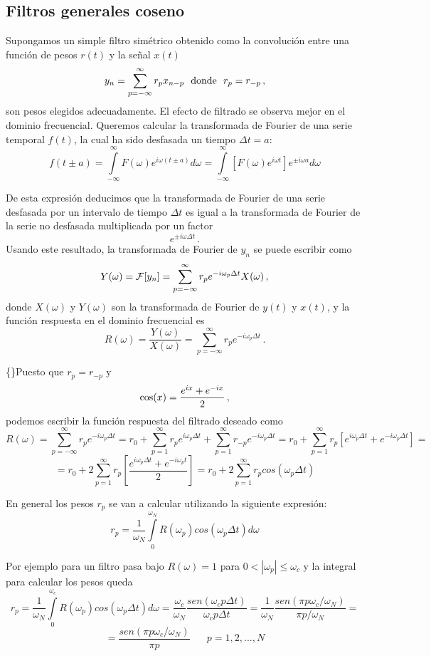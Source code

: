 \documentclass[
]{agujournal2019}
\begin{document}
\subsection{Filtros generales coseno}

Supongamos un simple filtro simétrico obtenido como la convolución entre
una función de pesos \(r(t)\) y la señal \(x(t)\)
\[y_n=\sum\limits^{\infty}_{p=-\infty} r_p x_{n-p}\,\,\,\,{\rm donde}\,\,\,\,r_p=r_{-p}\,,\]
son pesos elegidos adecuadamente. El efecto de filtrado se observa mejor
en el dominio frecuencial. Queremos calcular la transformada de Fourier
de una serie temporal \(f(t)\), la cual ha sido desfasada un tiempo
\(\Delta t = a\):
\[f(t\pm a)=\int\limits^{\infty}_{-\infty} F(\omega)e^{i\omega (t\pm a)} d{\omega}=
\int\limits^{\infty}_{-\infty}  \left[F(\omega) e^{i \omega t}\right]e^{\pm i \omega a} d{\omega}\]

De esta expresión deducimos que la transformada de Fourier de una serie
desfasada por un intervalo de tiempo \(\Delta t\) es igual a la
transformada de Fourier de la serie no desfasada multiplicada por un
factor \[e^{\pm i\omega \Delta t}\,.\] Usando este resultado, la
transformada de Fourier de \(y_n\) se puede escribir como
\[Y(\omega)={\cal F}[y_n]=\sum\limits^{\infty}_{p=-\infty} r_p e^{-i\omega_p \Delta t} X(\omega)\,,\]
donde \(X(\omega)\) y \(Y(\omega)\) son la transformada de Fourier de
\(y(t)\) y \(x(t)\), y la función respuesta en el dominio frecuencial es
\[R(\omega)=\frac{Y(\omega)}{X(\omega)}=\sum\limits^{\infty}_{p=-\infty} r_p e^{-i\omega_p \Delta t}\,.\]

\{\noindent\}Puesto que \(r_p=r_{-p}\) y
\[{\rm cos}(x)=\frac{e^{ix} + e^{-ix}}{2}\,,\] podemos escribir la
función respuesta del filtrado deseado como
\[R(\omega)=\sum\limits^{\infty}_{p=-\infty} r_p e^{-i\omega_p \Delta t}=
r_0 + \sum\limits^{\infty}_{p=1} r_p e^{i\omega_p \Delta t}
+ \sum\limits^{\infty}_{p=1} r_{-p} e^{-i\omega_p \Delta t} =
r_0 + \sum\limits^{\infty}_{p=1} r_p \left[ e^{i\omega_p \Delta t} + e^{-i\omega_p \Delta t}\right]=
\] \[
=r_0 + 2\sum\limits^{\infty}_{p=1} r_p \left[ \frac{e^{i\omega_p \Delta t} + e^{-i\omega_p t}}{2}\right]=
r_0 + 2\sum\limits^{\infty}_{p=1}r_p cos(\omega_p \Delta t)\]

En general los pesos \(r_p\) se van a calcular utilizando la siguiente
expresión:
\[r_p=\frac{1}{\omega_N}\int\limits^{\omega_N}_0 R(\omega_p) cos(\omega_p \Delta t
)d{\omega}\]

Por ejemplo para un filtro pasa bajo \(R(\omega)=1\) para
\(0<|\omega_p|\le \omega_c\) y la integral para calcular los pesos queda
\[r_p=\frac{1}{\omega_N}\int\limits^{\omega_c}_0 R(\omega_p) cos(\omega_p \Delta t
)d{\omega}=\frac{\omega_c}{\omega_N}\frac{sen(\omega_c p \Delta t)}{\omega_c p \Delta t}=
      \frac{1}{\omega_N}\frac{sen(\pi p \omega_c / \omega_N)}{\pi p / \omega_N}=\]
\[=\frac{sen(\pi p \omega_c / \omega_N)}{\pi p}\,\,\,\,\,\,\,\,\,\,p=1,2,...,N\]
\end{document}
